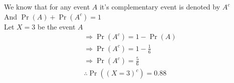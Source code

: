 \documentclass[twocolumn,12pt]{article}
\providecommand{\pr}[1]{\ensuremath{\Pr\left(#1\right)}}
\begin{document}
We know that for any event $A$ it's complementary event is denoted by $A^{c}$\\
And $\pr{A} + \pr{A^{c}} = 1 $ \\
Let $X=3$ be the event $A$ \\
\begin{align}
\Rightarrow \pr{A^{c}}  = 1 - \pr{A} \\
\Rightarrow \pr{A^{c}}  = 1 - \frac{1}{6} \\
\Rightarrow \pr{A^{c}}  = \frac{5}{6} \\
\therefore \pr{(X=3)^{c}} = 0.88
\end{align}
\end{document}
